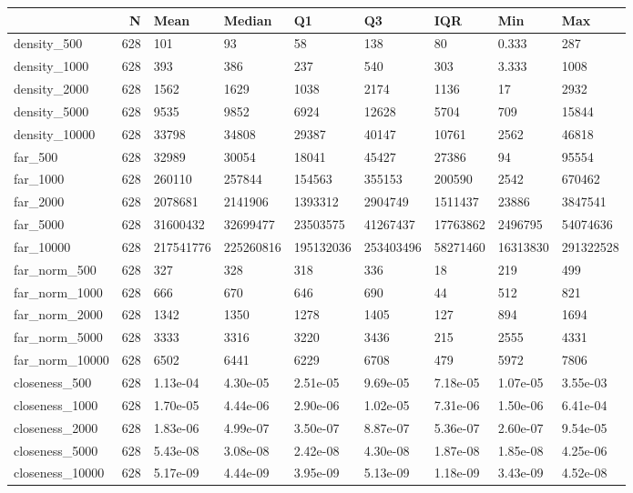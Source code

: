 \begin{tabular}{lrlllllll}
\toprule
 & N & Mean & Median & Q1 & Q3 & IQR & Min & Max \\
\midrule
density\_500 & 628 & 101 & 93 & 58 & 138 & 80 & 0.333 & 287 \\
density\_1000 & 628 & 393 & 386 & 237 & 540 & 303 & 3.333 & 1008 \\
density\_2000 & 628 & 1562 & 1629 & 1038 & 2174 & 1136 & 17 & 2932 \\
density\_5000 & 628 & 9535 & 9852 & 6924 & 12628 & 5704 & 709 & 15844 \\
density\_10000 & 628 & 33798 & 34808 & 29387 & 40147 & 10761 & 2562 & 46818 \\
far\_500 & 628 & 32989 & 30054 & 18041 & 45427 & 27386 & 94 & 95554 \\
far\_1000 & 628 & 260110 & 257844 & 154563 & 355153 & 200590 & 2542 & 670462 \\
far\_2000 & 628 & 2078681 & 2141906 & 1393312 & 2904749 & 1511437 & 23886 & 3847541 \\
far\_5000 & 628 & 31600432 & 32699477 & 23503575 & 41267437 & 17763862 & 2496795 & 54074636 \\
far\_10000 & 628 & 217541776 & 225260816 & 195132036 & 253403496 & 58271460 & 16313830 & 291322528 \\
far\_norm\_500 & 628 & 327 & 328 & 318 & 336 & 18 & 219 & 499 \\
far\_norm\_1000 & 628 & 666 & 670 & 646 & 690 & 44 & 512 & 821 \\
far\_norm\_2000 & 628 & 1342 & 1350 & 1278 & 1405 & 127 & 894 & 1694 \\
far\_norm\_5000 & 628 & 3333 & 3316 & 3220 & 3436 & 215 & 2555 & 4331 \\
far\_norm\_10000 & 628 & 6502 & 6441 & 6229 & 6708 & 479 & 5972 & 7806 \\
closeness\_500 & 628 & 1.13e-04 & 4.30e-05 & 2.51e-05 & 9.69e-05 & 7.18e-05 & 1.07e-05 & 3.55e-03 \\
closeness\_1000 & 628 & 1.70e-05 & 4.44e-06 & 2.90e-06 & 1.02e-05 & 7.31e-06 & 1.50e-06 & 6.41e-04 \\
closeness\_2000 & 628 & 1.83e-06 & 4.99e-07 & 3.50e-07 & 8.87e-07 & 5.36e-07 & 2.60e-07 & 9.54e-05 \\
closeness\_5000 & 628 & 5.43e-08 & 3.08e-08 & 2.42e-08 & 4.30e-08 & 1.87e-08 & 1.85e-08 & 4.25e-06 \\
closeness\_10000 & 628 & 5.17e-09 & 4.44e-09 & 3.95e-09 & 5.13e-09 & 1.18e-09 & 3.43e-09 & 4.52e-08 \\

\end{tabular}
